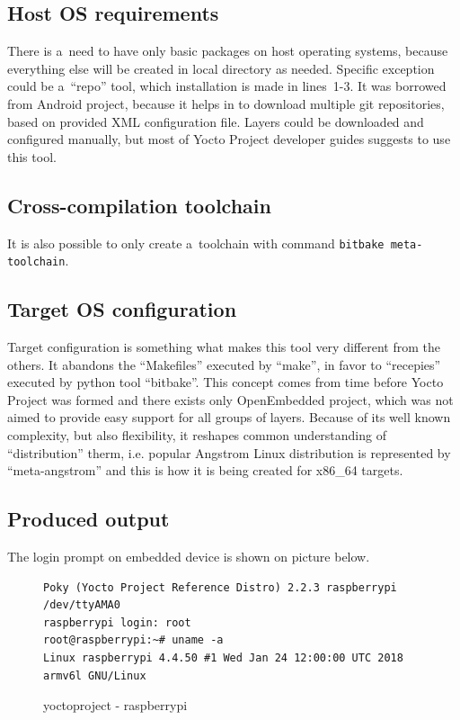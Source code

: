 \documentclass[printmode]{mgr}
\begin{document}
\subsection*{Host OS requirements}

There is a~need to have only basic packages on host operating systems, because everything else will be created in local directory as needed.
Specific exception could be a~``repo'' tool, which installation is made in lines~1-3.
It was borrowed from Android project, because it helps in to download multiple git repositories, based on provided XML configuration file.
Layers could be downloaded and configured manually, but most of Yocto Project developer guides suggests to use this tool.

\subsection*{Cross-compilation toolchain}
It is also possible to only create a~toolchain with command \verb|bitbake meta-toolchain|.

\subsection*{Target OS configuration}
Target configuration is something what makes this tool very different from the others.
It abandons the ``Makefiles'' executed by ``make'', in favor to ``recepies'' executed by python tool ``bitbake''.
This concept comes from time before Yocto Project was formed and there exists only OpenEmbedded project, which was not aimed to provide easy support for all groups of layers.
Because of its well known complexity, but also flexibility, it reshapes common understanding of ``distribution'' therm, i.e. popular Angstrom Linux distribution is represented by ``meta-angstrom'' and this is how it is being created for x86\_64 targets.

\subsection*{Produced output}
The login prompt on embedded device is shown on picture below.


\begin{figure}
    \centering
\begin{verbatim}
Poky (Yocto Project Reference Distro) 2.2.3 raspberrypi /dev/ttyAMA0
raspberrypi login: root
root@raspberrypi:~# uname -a
Linux raspberrypi 4.4.50 #1 Wed Jan 24 12:00:00 UTC 2018 armv6l GNU/Linux
\end{verbatim}
    \caption{yoctoproject - raspberrypi}
\end{figure}
\end{document}

